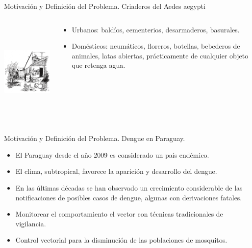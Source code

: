 \begin{frame}[t]{Motivación y Definición del Problema.  Criaderos del Aedes aegypti}
    \begin{columns}[c]
        \begin{column}[c]{5cm}
            \includegraphics[height=5cm]{../book/capitulo-3/graphics/criaderos-domicilio.png}
        \end{column}

        \begin{column}[c]{5cm}
          \begin{itemize}
          \item Urbanos: baldíos, cementerios, desarmaderos, basurales.

          \item Domésticos: neumáticos, floreros, botellas, bebederos de animales, latas abiertas, prácticamente de cualquier objeto que retenga agua.
          \end{itemize}
    \end{column}
  \end{columns}
\end{frame}




\begin{frame}[t]{Motivación y Definición del Problema. Dengue en Paraguay.}
  \begin{center}
    \begin{itemize}
    \item El Paraguay desde el año 2009 es considerado un país endémico.

    \item El clima, subtropical, favorece la aparición y desarrollo del dengue.

    \item En las últimas décadas se han observado un crecimiento considerable de las notificaciones de posibles casos de dengue, algunas con derivaciones fatales.

    \item Monitorear el comportamiento el vector con técnicas tradicionales de vigilancia.

    \item Control vectorial para la disminución de las poblaciones de mosquitos.
    \end{itemize}
  \end{center}
\end{frame}

